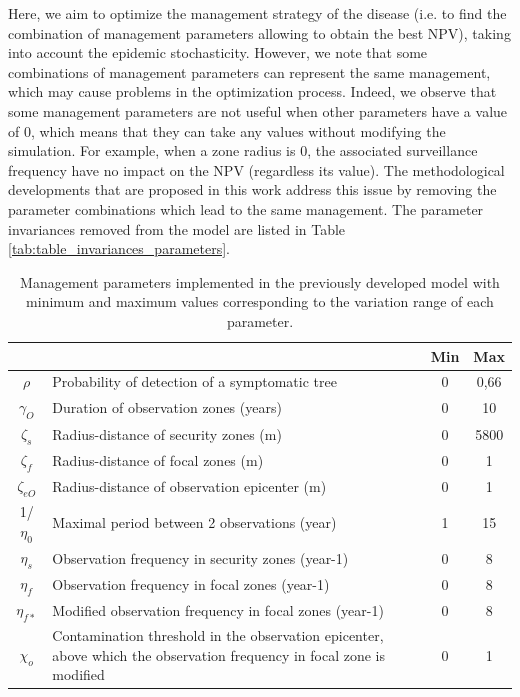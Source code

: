 Here, we aim to optimize the management strategy of the disease (i.e. to find the combination of management parameters allowing to obtain the best NPV), 
taking into account the epidemic stochasticity. However, we note that some combinations of management parameters can represent the same management, 
which may cause problems in the optimization process. Indeed, we observe that some management parameters are not useful when other parameters have a value of 0, 
which means that they can take any values without modifying the simulation. For example, when a zone radius is 0, the associated surveillance frequency have no impact on the NPV (regardless its value). 
The methodological developments that are proposed in this work address this issue by removing the parameter combinations which lead to the same management. 
The parameter invariances removed from the model are listed in Table \ref{tab:table_invariances_parameters}.

\begin{table}[htbp]
		\centering
		\caption{Management parameters implemented in the previously developed model  with minimum and maximum values corresponding to the variation range of each parameter.}
		\begin{tabular}{|c|p{33.785em}|c|c|}
			\cmidrule{3-4}    \multicolumn{1}{c}{} & \multicolumn{1}{c|}{} & \textbf{Min} & \textbf{Max} \\
			\midrule
			$\rho$    & Probability of detection of a symptomatic tree & 0     & 0,66 \\
			\midrule
			$\gamma_{O}$    & Duration of observation zones (years) & 0     & 10 \\
			\midrule
			$\zeta_{s}$   & Radius-distance of security zones (m) & 0     & 5800 \\
			\midrule
			$\zeta_{f}$  & Radius-distance of focal zones (m) & 0     & 1 \\
			\midrule
			$\zeta_{eO}$ & Radius-distance of observation epicenter (m) & 0     & 1 \\
			\midrule
			1/$\eta_{0}$  & Maximal period between 2 observations (year) & 1     & 15 \\
			\midrule
			$\eta_{s}$    & Observation frequency in security zones (year-1) & 0     & 8 \\
			\midrule
			$\eta_{f}$    & Observation frequency in focal zones (year-1) & 0     & 8 \\
			\midrule
			$\eta_{f*}$   & Modified observation frequency in focal zones (year-1) & 0     & 8 \\
			\midrule
			$\chi_{o}$    & Contamination threshold in the observation epicenter, above which the observation frequency in focal zone is modified & 0     & 1 \\
			\bottomrule
		\end{tabular}%
		\label{tab:tableparameters}%
	\end{table}%
	
